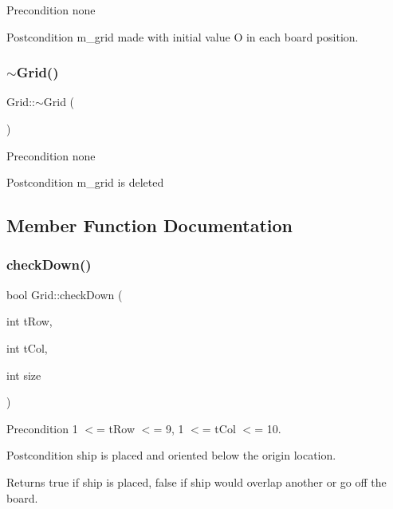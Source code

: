 \begin{DoxyPrecond}{Precondition}
none 
\end{DoxyPrecond}
\begin{DoxyPostcond}{Postcondition}
m\+\_\+grid made with initial value \textquotesingle{}O\textquotesingle{} in each board position. 
\end{DoxyPostcond}
\mbox{\label{classGrid_a3661d0a7f998caaaf8627d7a67072116}} 
\subsubsection{\texorpdfstring{$\sim$\+Grid()}{~Grid()}}
{\footnotesize\ttfamily Grid\+::$\sim$\+Grid (\begin{DoxyParamCaption}{ }\end{DoxyParamCaption})}

\begin{DoxyPrecond}{Precondition}
none 
\end{DoxyPrecond}
\begin{DoxyPostcond}{Postcondition}
m\+\_\+grid is deleted 
\end{DoxyPostcond}


\subsection{Member Function Documentation}
\mbox{\label{classGrid_ad2eddab31788809b0a1d4a34f0410ddc}} 
\subsubsection{\texorpdfstring{check\+Down()}{checkDown()}}
{\footnotesize\ttfamily bool Grid\+::check\+Down (\begin{DoxyParamCaption}\item[{int}]{t\+Row,  }\item[{int}]{t\+Col,  }\item[{int}]{size }\end{DoxyParamCaption})}

\begin{DoxyPrecond}{Precondition}
1 $<$= t\+Row $<$= 9, 1 $<$= t\+Col $<$= 10. 
\end{DoxyPrecond}
\begin{DoxyPostcond}{Postcondition}
ship is placed and oriented below the origin location. 
\end{DoxyPostcond}
\begin{DoxyReturn}{Returns}
true if ship is placed, false if ship would overlap another or go off the board. 
\end{DoxyReturn}

